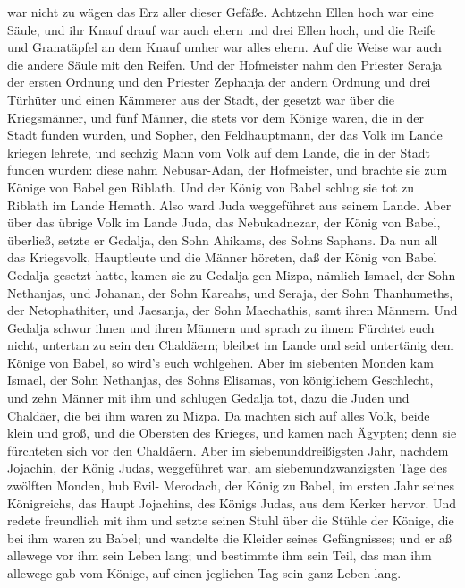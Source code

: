 war nicht zu wägen das Erz aller dieser Gefäße.  Achtzehn
Ellen hoch war eine Säule, und ihr Knauf drauf war auch ehern und drei
Ellen hoch, und die Reife und Granatäpfel an dem Knauf umher war alles
ehern. Auf die Weise war auch die andere Säule mit den Reifen.
 Und der Hofmeister nahm den Priester Seraja der ersten
Ordnung und den Priester Zephanja der andern Ordnung und drei Türhüter
 und einen Kämmerer aus der Stadt, der gesetzt war über die
Kriegsmänner, und fünf Männer, die stets vor dem Könige waren, die in
der Stadt funden wurden, und Sopher, den Feldhauptmann, der das Volk im
Lande kriegen lehrete, und sechzig Mann vom Volk auf dem Lande, die in
der Stadt funden wurden:  diese nahm Nebusar-Adan, der
Hofmeister, und brachte sie zum Könige von Babel gen Riblath.
 Und der König von Babel schlug sie tot zu Riblath im Lande
Hemath. Also ward Juda weggeführet aus seinem Lande.  Aber
über das übrige Volk im Lande Juda, das Nebukadnezar, der König von
Babel, überließ, setzte er Gedalja, den Sohn Ahikams, des Sohns Saphans.
 Da nun all das Kriegsvolk, Hauptleute und die Männer
höreten, daß der König von Babel Gedalja gesetzt hatte, kamen sie zu
Gedalja gen Mizpa, nämlich Ismael, der Sohn Nethanjas, und Johanan, der
Sohn Kareahs, und Seraja, der Sohn Thanhumeths, der Netophathiter, und
Jaesanja, der Sohn Maechathis, samt ihren Männern.  Und
Gedalja schwur ihnen und ihren Männern und sprach zu ihnen: Fürchtet
euch nicht, untertan zu sein den Chaldäern; bleibet im Lande und seid
untertänig dem Könige von Babel, so wird's euch wohlgehen. 
Aber im siebenten Monden kam Ismael, der Sohn Nethanjas, des Sohns
Elisamas, von königlichem Geschlecht, und zehn Männer mit ihm und
schlugen Gedalja tot, dazu die Juden und Chaldäer, die bei ihm waren zu
Mizpa.  Da machten sich auf alles Volk, beide klein und
groß, und die Obersten des Krieges, und kamen nach Ägypten; denn sie
fürchteten sich vor den Chaldäern.  Aber im
siebenunddreißigsten Jahr, nachdem Jojachin, der König Judas,
weggeführet war, am siebenundzwanzigsten Tage des zwölften Monden, hub
Evil- Merodach, der König zu Babel, im ersten Jahr seines Königreichs,
das Haupt Jojachins, des Königs Judas, aus dem Kerker hervor.
 Und redete freundlich mit ihm und setzte seinen Stuhl über
die Stühle der Könige, die bei ihm waren zu Babel;  und
wandelte die Kleider seines Gefängnisses; und er aß allewege vor ihm
sein Leben lang;  und bestimmte ihm sein Teil, das man ihm
allewege gab vom Könige, auf einen jeglichen Tag sein ganz Leben lang.
